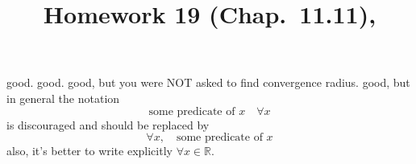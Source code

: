 \documentclass[10pt]{article} %
\title{Homework 19 (Chap.~11.11),
}
\begin{document}
\maketitle
{}
good.
good.
good, but you were NOT asked to find convergence radius.
good, but in general the notation
\begin{equation*}
	\mbox{some predicate of $x$}\quad\forall x
\end{equation*}
is discouraged and should be replaced by
\begin{equation*}
 	\forall x,\quad
	\mbox{some predicate of $x$}
\end{equation*}
also, it's better to write explicitly $\forall x\in\mathbb{R}$.
\end{document}
